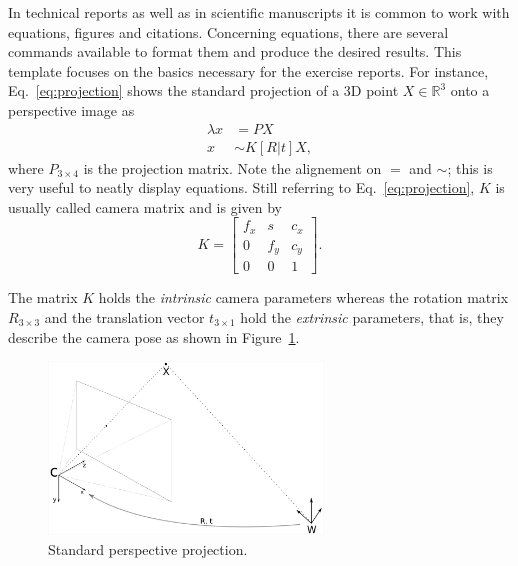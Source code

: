 \documentclass[a4paper, twoside, english]{article}
\begin{document}
{In technical reports as well as in scientific manuscripts it is common to work with equations, figures and citations.
Concerning equations, there are several commands available to format them and produce the desired results.
This template focuses on the basics necessary for the exercise reports.
For instance, Eq.~\ref{eq:projection} shows the standard projection of a 3D point $X \in \mathbb{R}^3$ onto a perspective image as
\begin{equation}
 \begin{aligned}
  \lambda x &= P X \\
          x &\sim K \left[ R | t \right] X,
 \end{aligned}
 \label{eq:projection}
\end{equation}
where $P_{3 \times 4}$ is the projection matrix.
Note the alignement on $=$ and $\sim$; this is very useful to neatly display equations.
Still referring to Eq.~\ref{eq:projection}, $K$ is usually called camera matrix and is given by
\begin{equation*}
 K = \left[
 \begin{array}{ccc}
  f_x & s & c_x \\
  0 & f_y & c_y \\
  0 & 0 & 1
 \end{array}
 \right].
 \label{eq:kmatrix}
\end{equation*}

The matrix $K$ holds the \emph{intrinsic} camera parameters whereas the rotation matrix $R_{3 \times 3}$ and the translation vector $t_{3 \times 1}$ hold the \emph{extrinsic} parameters, that is, 
they describe the camera pose as shown in Figure~\ref{fig:stdProj}.
\begin{figure}[ht]
 \centerline{\includegraphics[width=0.65\textwidth]{stdProjection.png}}
 \caption[Standard perspective projection]{Standard perspective projection.}
 \label{fig:stdProj}
\end{figure}

}
\end{document}

